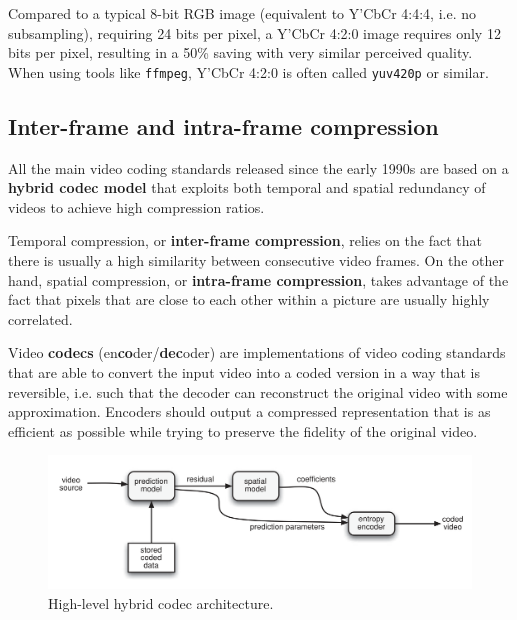 Compared to a typical 8-bit RGB image (equivalent to Y'CbCr 4:4:4, i.e. no subsampling), requiring 24 bits per pixel, a Y'CbCr 4:2:0 image requires only 12 bits per pixel, resulting in a 50\% saving with very similar perceived quality. When using tools like \texttt{ffmpeg}, Y'CbCr 4:2:0 is often called \texttt{yuv420p} or similar.

\subsection{Inter-frame and intra-frame compression}
\label{sec:bg/compression/intra-inter}

All the main video coding standards released since the early 1990s are based on a \textbf{hybrid codec model} that exploits both temporal and spatial redundancy of videos to achieve high compression ratios.

Temporal compression, or \textbf{inter-frame compression}, relies on the fact that there is usually a high similarity between consecutive video frames. On the other hand, spatial compression, or \textbf{intra-frame compression}, takes advantage of the fact that pixels that are close to each other within a picture are usually highly correlated.

Video \textbf{codecs} (en\textbf{co}der/\textbf{dec}oder) are implementations of video coding standards that are able to convert the input video into a coded version in a way that is reversible, i.e. such that the decoder can reconstruct the original video with some approximation. Encoders should output a compressed representation that is as efficient as possible while trying to preserve the fidelity of the original video.

\begin{figure}[h]
	\centering
	
	\includegraphics[width=\textwidth]{res/hybrid_codec_high_level.png}
	
	\caption{High-level hybrid codec architecture.\cite{h264}}
	\label{fig:codec_highlevel}
\end{figure}

